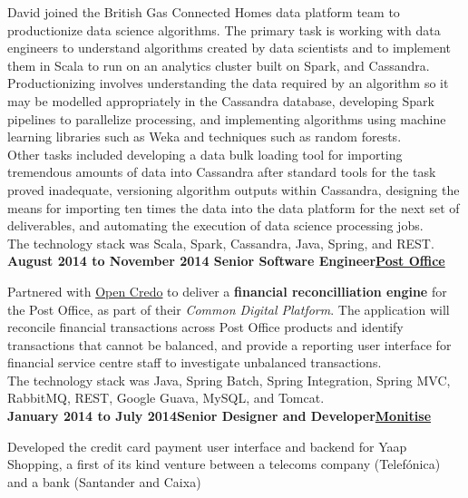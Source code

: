 \documentclass[a4paper,12pt]{article}
\newcommand{\clientwork}[3]{\textbf{#1\hfill#3\hfill#2}\nopagebreak}
\begin{document}
David joined the British Gas Connected Homes data platform team to productionize data science algorithms. The primary task is working with data engineers to understand algorithms created by data scientists and to implement them in Scala to run on an analytics cluster built on Spark, and Cassandra.\\

Productionizing involves understanding the data required by an algorithm so it may be modelled appropriately in the Cassandra database, developing Spark pipelines to parallelize processing, and implementing algorithms using machine learning libraries such as Weka and techniques such as random forests.\\

Other tasks included developing a data bulk loading tool for importing tremendous amounts of data into Cassandra after standard tools for the task proved inadequate, versioning algorithm outputs within Cassandra, designing the means for importing ten times the data into the data platform for the next set of deliverables, and automating the execution of data science processing jobs.\\

The technology stack was Scala, Spark, Cassandra, Java, Spring, and REST.\\

\clientwork{August 2014 to November 2014 }{\href{http://www.postoffice.co.uk/}{Post Office}}{Senior Software Engineer}

Partnered with \href{http://www.opencredo.com/}{Open Credo} to deliver a \textbf{financial reconcilliation engine} for the Post Office, as part of their \emph{Common Digital Platform}. The application will reconcile financial transactions across Post Office products and identify transactions that cannot be balanced, and provide a reporting user interface for financial service centre staff to investigate unbalanced transactions.\\

The technology stack was Java, Spring Batch, Spring Integration, Spring MVC, RabbitMQ, REST, Google Guava, MySQL, and Tomcat.\\

\clientwork{January 2014 to July 2014}{\href{http://www.monitise.com/}{Monitise}}{Senior Designer and Developer}

Developed the credit card payment user interface and backend for Yaap Shopping, a first of its kind venture between a telecoms company (Telef\'onica) and a bank (Santander and Caixa)\\
\end{document}
